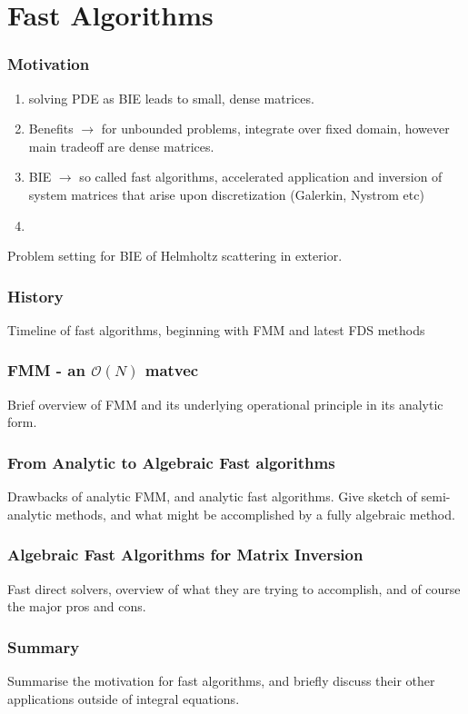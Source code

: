 \section{Fast Algorithms}

\begin{frame}
    \frametitle{Motivation}

    \begin{enumerate}
        \item solving PDE as BIE leads to small, dense matrices.
        \item Benefits $\rightarrow$ for unbounded problems, integrate over fixed domain, however main tradeoff are dense matrices.
        \item BIE $\rightarrow$ so called fast algorithms, accelerated application and inversion of system matrices that arise upon discretization (Galerkin, Nystrom etc)
        \item 
    \end{enumerate}
\end{frame}

\begin{frame}
    Problem setting for BIE of Helmholtz scattering in exterior.
\end{frame}

\begin{frame}
    \frametitle{History}
    Timeline of fast algorithms, beginning with FMM and latest FDS methods
\end{frame}


\begin{frame}
    \frametitle{FMM - an $\mathcal{O}(N)$ matvec}

    Brief overview of FMM and its underlying operational principle in its analytic form.
\end{frame}

\begin{frame}
    \frametitle{From Analytic to Algebraic Fast algorithms}
    Drawbacks of analytic FMM, and analytic fast algorithms. Give sketch of semi-analytic methods, and what might be accomplished by a fully algebraic method.
\end{frame}


\begin{frame}
    \frametitle{Algebraic Fast Algorithms for Matrix Inversion}
    Fast direct solvers, overview of what they are trying to accomplish, and of course the major pros and cons.
\end{frame}


\begin{frame}
    \frametitle{Summary}
    Summarise the motivation for fast algorithms, and briefly discuss their other applications outside of integral equations.
\end{frame}

